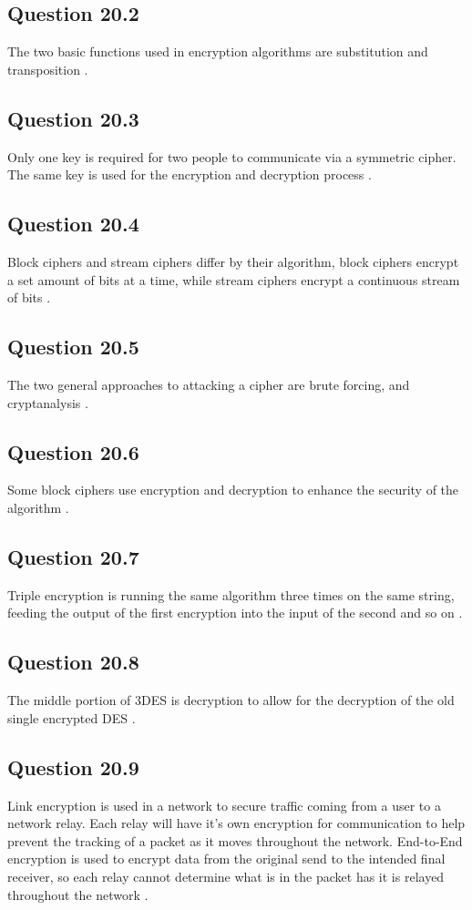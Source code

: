 \documentclass[14pt]{extarticle}
\begin{document}
\subsection{Question 20.2 \cite[p.~664]{stallings}}
The two basic functions used in encryption algorithms are substitution and transposition \cite[p.~639]{stallings}.
\subsection{Question 20.3 \cite[p.~664]{stallings}}
Only one key is required for two people to communicate via a symmetric cipher. The same key is used for the encryption and decryption process \cite[p.~639]{stallings}.
\subsection{Question 20.4 \cite[p.~664]{stallings}}
Block ciphers and stream ciphers differ by their algorithm, block ciphers encrypt a set amount of bits at a time, while stream ciphers encrypt a continuous stream of bits \cite[p.~651]{stallings}.
\subsection{Question 20.5 \cite[p.~664]{stallings}}
The two general approaches to attacking a cipher are brute forcing, and cryptanalysis \cite[p.~639]{stallings}.
\subsection{Question 20.6 \cite[p.~664]{stallings}}
Some block ciphers use encryption and decryption to enhance the security of the algorithm \cite[p.~644]{stallings}.
\subsection{Question 20.7 \cite[p.~664]{stallings}}
Triple encryption is running the same algorithm three times on the same string, feeding the output of the first encryption into the input of the second and so on \cite[p.~644]{stallings}.
\subsection{Question 20.8 \cite[p.~664]{stallings}}
The middle portion of 3DES is decryption to allow for the decryption of the old single encrypted DES \cite[p.~644]{stallings}.
\subsection{Question 20.9 \cite[p.~664]{stallings}}
Link encryption is used in a network to secure traffic coming from a user to a network relay. Each relay will have it's own encryption for communication to help prevent the tracking of a packet as it moves throughout the network. End-to-End encryption is used to encrypt data from the original send to the intended final receiver, so each relay cannot determine what is in the packet has it is relayed throughout the network \cite[p.~661]{stallings}.
\end{document}
